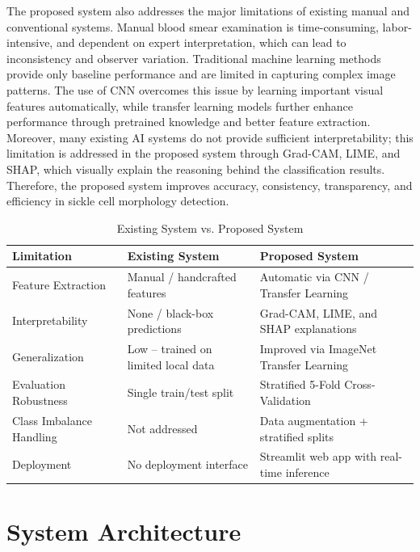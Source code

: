 The proposed system also addresses the major limitations of existing manual and conventional systems. Manual blood smear examination is time-consuming, labor-intensive, and dependent on expert interpretation, which can lead to inconsistency and observer variation. Traditional machine learning methods provide only baseline performance and are limited in capturing complex image patterns. The use of CNN overcomes this issue by learning important visual features automatically, while transfer learning models further enhance performance through pretrained knowledge and better feature extraction. Moreover, many existing AI systems do not provide sufficient interpretability; this limitation is addressed in the proposed system through Grad-CAM, LIME, and SHAP, which visually explain the reasoning behind the classification results. Therefore, the proposed system improves accuracy, consistency, transparency, and efficiency in sickle cell morphology detection.

\begin{table}[htbp]
\centering
\caption{Existing System vs. Proposed System}
\label{tab:existing-system-vs-proposed-system}
\begin{tabular}{|p{}|p{}|p{}|}
\hline
\textbf{Limitation} & \textbf{Existing System} & \textbf{Proposed System} \\ \hline
Feature Extraction & Manual / handcrafted features & Automatic via CNN / Transfer Learning \\ \hline
Interpretability & None / black-box predictions & Grad-CAM, LIME, and SHAP explanations \\ \hline
Generalization & Low -- trained on limited local data & Improved via ImageNet Transfer Learning \\ \hline
Evaluation Robustness & Single train/test split & Stratified 5-Fold Cross-Validation \\ \hline
Class Imbalance Handling & Not addressed & Data augmentation + stratified splits \\ \hline
Deployment & No deployment interface & Streamlit web app with real-time inference \\ \hline
\end{tabular}
\end{table}

\section{System Architecture}

